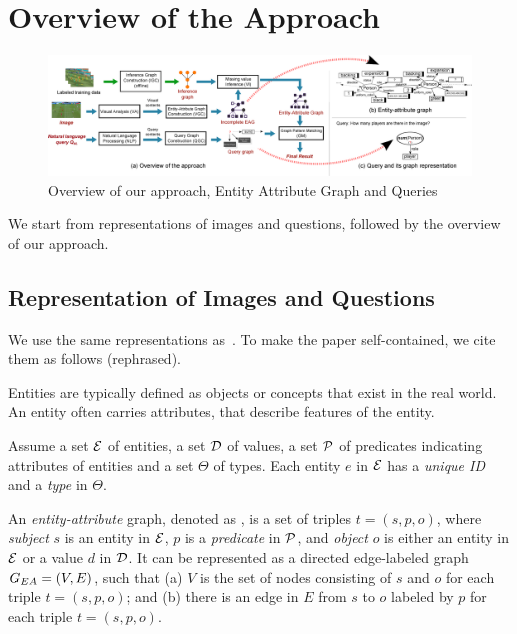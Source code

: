 \section{Overview of the Approach}
\label{sec-overview}

\begin{figure}[tb!]
\vspace{-1ex}
\centerline{\includegraphics[scale=0.28]{./figure/overview.eps}}
\caption{Overview of our approach, Entity Attribute Graph and Queries} \label{fig-overview}
\vspace{-2ex}
\end{figure}

We start from representations of images and questions, followed by the overview of our approach.


\subsection{Representation of Images and Questions}
\label{sec-representation}

We use the same representations as~\cite{peixi2019}. To make the paper self-contained, we cite them as follows (rephrased). 

 Entities are typically defined as objects or concepts that exist in the real world. An entity often carries attributes, that describe features of the entity. 

Assume a set ${\cal E}$ of entities, a set ${\cal D}$ of values, a set ${\cal P}$ of predicates indicating attributes of entities and a set $\Theta$ of types. 
Each entity $e$ in ${\cal E}$ has a {\em unique ID} and a {\em type} in $\Theta$.

An {\em entity-attribute} graph, denoted as , is a set of triples $t = (s, p, o)$, where {\em subject} $s$ is an entity in ${\cal E}$, $p$ is a {\em predicate} in ${\cal P}$, and {\em object} $o$ is either an entity in ${\cal E}$ or a value $d$ in ${\cal D}$. It can be represented as a directed edge-labeled graph $G_{EA}=(V, E)$, such that (a) $V$ is the set of nodes consisting of $s$ and $o$ for each triple $t = (s, p, o)$; and (b) there is an edge in $E$ from $s$ to $o$ labeled by $p$ for each triple $t = (s, p, o)$. 


